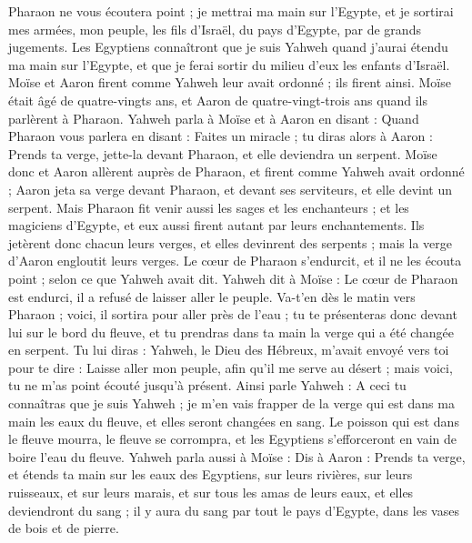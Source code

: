 \begin{multicols}{2}
Pharaon ne vous écoutera point ; je mettrai ma main sur l'Egypte, et je sortirai mes armées, mon peuple, les fils d'Israël, du pays d'Egypte, par de grands jugements.
Les Egyptiens connaîtront que je suis Yahweh quand j'aurai étendu ma main sur l'Egypte, et que je ferai sortir du milieu d'eux les enfants d'Israël.
Moïse et Aaron firent comme Yahweh leur avait ordonné ; ils firent ainsi.
Moïse était âgé de quatre-vingts ans, et Aaron de quatre-vingt-trois ans quand ils parlèrent à Pharaon.
Yahweh parla à Moïse et à Aaron en disant :
Quand Pharaon vous parlera en disant : Faites un miracle ; tu diras alors à Aaron : Prends ta verge, jette-la devant Pharaon, et elle deviendra un serpent.
Moïse donc et Aaron allèrent auprès de Pharaon, et firent comme Yahweh avait ordonné ; Aaron jeta sa verge devant Pharaon, et devant ses serviteurs, et elle devint un serpent.
Mais Pharaon fit venir aussi les sages et les enchanteurs ; et les magiciens d'Egypte, et eux aussi firent autant par leurs enchantements.
Ils jetèrent donc chacun leurs verges, et elles devinrent des serpents ; mais la verge d'Aaron engloutit leurs verges.
Le cœur de Pharaon s'endurcit, et il ne les écouta point ; selon ce que Yahweh avait dit.
Yahweh dit à Moïse : Le cœur de Pharaon est endurci, il a refusé de laisser aller le peuple.
Va-t'en dès le matin vers Pharaon ; voici, il sortira pour aller près de l'eau ; tu te présenteras donc devant lui sur le bord du fleuve, et tu prendras dans ta main la verge qui a été changée en serpent.
Tu lui diras : Yahweh, le Dieu des Hébreux, m'avait envoyé vers toi pour te dire : Laisse aller mon peuple, afin qu'il me serve au désert ; mais voici, tu ne m'as point écouté jusqu’à présent.
Ainsi parle Yahweh : A ceci tu connaîtras que je suis Yahweh ; je m'en vais frapper de la verge qui est dans ma main les eaux du fleuve, et elles seront changées en sang.
Le poisson qui est dans le fleuve mourra, le fleuve se corrompra, et les Egyptiens s’efforceront en vain de boire l’eau du fleuve.
Yahweh parla aussi à Moïse : Dis à Aaron : Prends ta verge, et étends ta main sur les eaux des Egyptiens, sur leurs rivières, sur leurs ruisseaux, et sur leurs marais, et sur tous les amas de leurs eaux, et elles deviendront du sang ; il y aura du sang par tout le pays d'Egypte, dans les vases de bois et de pierre.

\end{multicols}
